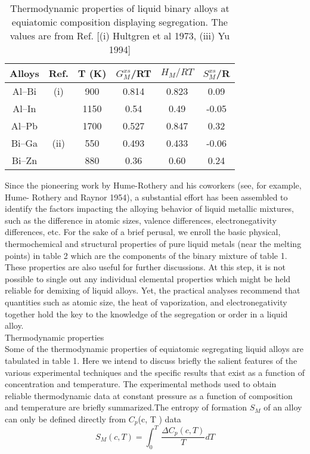 \documentclass[12pt]{article}
\newcommand*{\1}{\hspace{1pt}}
\begin{document}
 
\begin{table}[t!]
\centering
\caption{Thermodynamic properties of liquid binary alloys at equiatomic composition displaying
segregation. The values are from Ref. [(i) Hultgren et al 1973, (iii) Yu 1994]}
 \begin{tabular}{|c c c c c c|} 
 \hline
 Alloys & Ref. & T (K) & $G ^ {xs} _ {M}$/RT & $H _M/RT$ & $S ^ {xs} _ {M}$/R \\ [0.5ex] 
 \hline\hline
 Al–Bi & (i) & 900 & 0.814 & 0.823 & 0.09 \\ 
 Al–In &     & 1150 & 0.54 & 0.49 & -0.05 \\
 Al–Pb &     & 1700 & 0.527 & 0.847 & 0.32 \\
 Bi–Ga & (ii) & 550 & 0.493 & 0.433 & -0.06 \\
 Bi–Zn &     & 880 & 0.36 & 0.60 & 0.24 \\ [1ex] 
 \hline
 \end{tabular}
\end{table}

    Since the pioneering work by Hume-Rothery and his coworkers (see, for example, Hume-
Rothery and Raynor 1954), a substantial effort has been assembled to identify the factors
impacting the alloying behavior of liquid metallic mixtures, such as the difference in atomic
sizes, valence differences, electronegativity differences, etc. For the sake of a brief perusal, 
we enroll the basic physical, thermochemical and structural properties of pure liquid metals
(near the melting points) in table 2 which are the components of the binary mixture of
table 1. These properties are also useful for further discussions. At this step, it is not
possible to single out any individual elemental properties which might be held reliable
for demixing of liquid alloys. Yet, the practical analyses recommend
that quantities such as atomic size, the heat of vaporization, and electronegativity together hold
the key to the knowledge  of the segregation or order in a liquid alloy.\\


Thermodynamic properties \\


    Some of the thermodynamic properties of equiatomic segregating liquid alloys are tabulated
in table 1. Here we intend to discuss briefly the salient features of the various experimental
techniques and the specific results that exist as a function of concentration and temperature.
The experimental methods used to obtain reliable thermodynamic data at constant pressure
as a function of composition and temperature are briefly summarized.The entropy of formation $S _M$ 
of an alloy can only be defined directly from $C _p$(c, T ) data 
    \begin{equation}
        S _M(c,T) = \int_{0}^{T}  \,\frac{\Delta {C _p(c,T)}}{T} dT 
    \end{equation}                    
    \\
    \\
\end{document}
